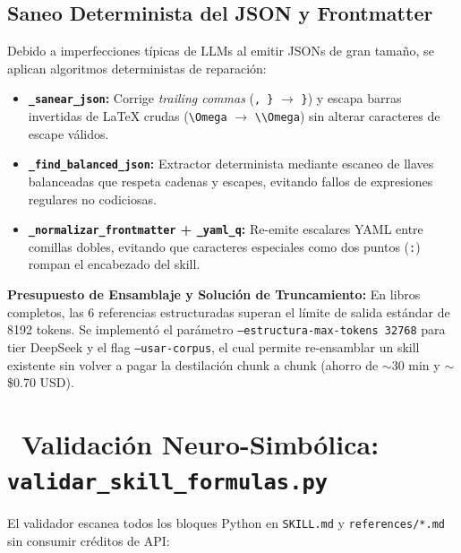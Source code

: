 \documentclass[11pt,a4paper]{article}
\newcommand{\iconotexto}[2]{\textcolor{cyanNeon}{\faIcon{#1}}~#2}
\begin{document}
\subsection{Saneo Determinista del JSON y Frontmatter}
Debido a imperfecciones típicas de LLMs al emitir JSONs de gran tamaño, se aplican algoritmos deterministas de reparación:
\begin{itemize}[leftmargin=*]
  \item \textbf{\texttt{\_sanear\_json}:} Corrige \textit{trailing commas} (\texttt{, \}} $\to$ \texttt{\}}) y escapa barras invertidas de LaTeX crudas (\texttt{\textbackslash Omega} $\to$ \texttt{\textbackslash\textbackslash Omega}) sin alterar caracteres de escape válidos.
  \item \textbf{\texttt{\_find\_balanced\_json}:} Extractor determinista mediante escaneo de llaves balanceadas que respeta cadenas y escapes, evitando fallos de expresiones regulares no codiciosas.
  \item \textbf{\texttt{\_normalizar\_frontmatter} + \texttt{\_yaml\_q}:} Re-emite escalares YAML entre comillas dobles, evitando que caracteres especiales como dos puntos (\texttt{:}) rompan el encabezado del skill.
\end{itemize}

\begin{cajaConcepto}
\textbf{Presupuesto de Ensamblaje y Solución de Truncamiento:} En libros completos, las 6 referencias estructuradas superan el límite de salida estándar de 8192 tokens. Se implementó el parámetro \texttt{--estructura-max-tokens 32768} para tier DeepSeek y el flag \texttt{--usar-corpus}, el cual permite re-ensamblar un skill existente sin volver a pagar la destilación chunk a chunk (ahorro de $\sim$30 min y $\sim$\$0.70 USD).
\end{cajaConcepto}

\section[Validación Neuro-Simbólica y Oráculo SymPy]{\iconotexto{shield-alt}{Validación Neuro-Simbólica: \texttt{validar\_skill\_formulas.py}}}

El validador escanea todos los bloques Python en \texttt{SKILL.md} y \texttt{references/*.md} sin consumir créditos de API:
\end{document}
